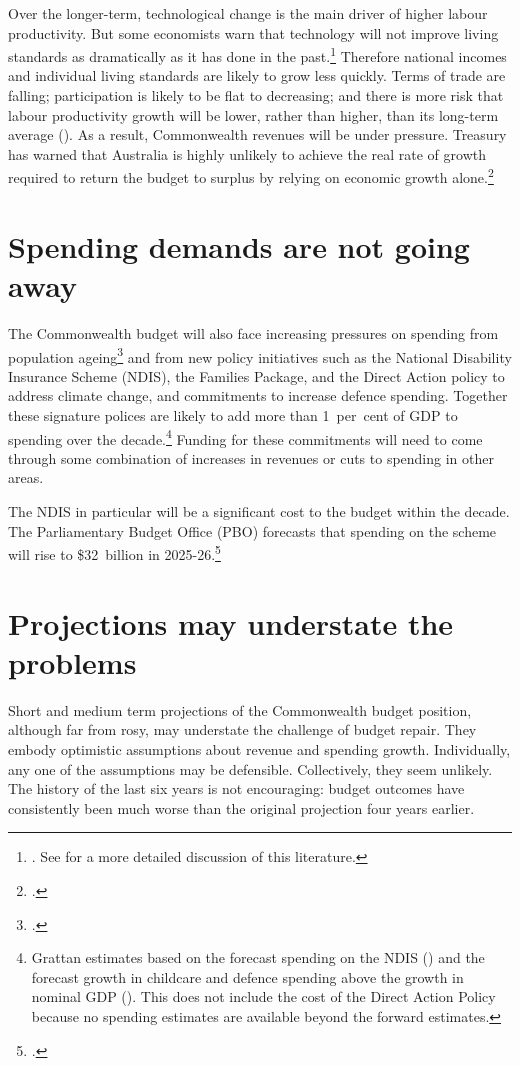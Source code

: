 \documentclass[twoside,english]{Dianab5ona4portrait}
\begin{document}
Over the longer-term, technological change is the main driver of higher labour productivity. But some economists warn that technology will not improve living standards as dramatically as it has done in the past.\footnote{\textcites{Gordon2012}{Cowen2011}. See \textcites{DaleyWoodWeidmannEtAl2014}{Dolamore2015} for a more detailed discussion of this literature.}  Therefore national incomes and individual living standards are likely to grow less quickly. Terms of trade are falling; participation is likely to be flat to decreasing; and there is more risk that labour productivity growth will be lower, rather than higher, than its long-term average (). As a result, Commonwealth revenues will be under pressure. Treasury has warned that Australia is highly unlikely to achieve the real rate of growth required to return the budget to surplus by relying on economic growth alone.\footcite{Parkinson2014}  

\section{Spending demands are not going away\label{sec:FISCAL-3-2}}
The Commonwealth budget will also face increasing pressures on spending from population ageing\footcite{Hockey2015IGR}  and from new policy initiatives such as the National Disability Insurance Scheme (NDIS), the Families Package, and the Direct Action policy to address climate change, and commitments to increase defence spending. Together these signature polices are likely to add more than 1~per~cent of GDP to spending over the decade.\footnote{Grattan estimates based on the forecast spending on the NDIS (\textcite{Commission2014})
and the forecast growth in childcare and defence spending above the growth in nominal GDP (\textcite{NationalCommissionAudit2014}). This does not include the cost of the Direct Action Policy because no spending estimates are available beyond the forward estimates. 
}  Funding for these commitments will need to come through some combination of increases in revenues or cuts to spending in other areas. 

The NDIS in particular will be a significant cost to the budget within the decade. The Parliamentary Budget Office (PBO) forecasts that spending on the scheme will rise to \$32~billion in 2025-26.\footcite[][5]{PBO2015} 

\section{Projections may understate the problems\label{sec:FISCAL-3-3}}
Short and medium term projections of the Commonwealth budget position, although far from rosy, may understate the challenge of budget repair. They embody optimistic assumptions about revenue and spending growth. Individually, any one of the assumptions may be defensible. Collectively, they seem unlikely. The history of the last six years is not encouraging: budget outcomes have consistently been much worse than the original projection four years earlier.
\end{document}
